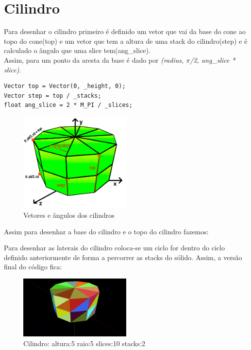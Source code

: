 \documentclass[a4paper]{report}
\begin{document}
\section{Cilindro}
Para desenhar o cilindro primeiro é definido um vetor que vai da base do cone ao
topo do cone(top) e um vetor que tem a altura de uma stack do cilindro(step) e
é calculado o ângulo que uma slice tem(ang\_slice).\\
Assim, para um ponto da aresta da base é dado por \textit{(radius, $\pi$/2,
ang\_slice * slice)}.
\begin{lstlisting}
Vector top = Vector(0, _height, 0);
Vector step = top / _stacks;
float ang_slice = 2 * M_PI / _slices;
\end{lstlisting}
\begin{figure}[H]
    \centering 
    \includegraphics[width=0.5\textwidth]{images/cilindro_vetores.png}  
    \caption{Vetores e ângulos dos cilindros}
    \label{fig:cilindro_vec}
\end{figure}
Assim para desenhar a base do cilindro e o topo do cilindro fazemos:


Para desenhar as laterais do cilindro coloca-se um ciclo for dentro do
ciclo definido anteriormente de forma a percorrer as stacks do sólido.
Assim, a versão final do código fica:




\begin{figure}[H]
    \centering 
    \includegraphics[width=0.5\textwidth]{images/cylinder.png}  
    \caption{Cilindro: altura:5 raio:5 slices:10 stacks:2}
    \label{fig:cilindro_render}
\end{figure}
\end{document}
